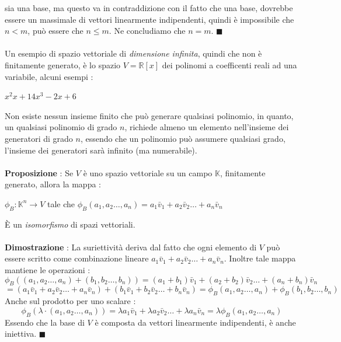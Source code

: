 \documentclass[12pt, letterpaper]{article}
\newcommand{\R}{{\mathbb R}}
\newcommand{\ve}{{\bar v}}
\newcommand{\acc}{\\\hphantom{}\\}
\begin{document}
sia una base, ma questo va in contraddizione con il fatto che una base, dovrebbe essere 
un massimale di vettori linearmente indipendenti, quindi è impossibile che \(n<m\), può essere che 
\(n\le m\). Ne concludiamo che \(n=m\). \(\blacksquare\)\acc 
Un esempio di spazio vettoriale di \textit{dimensione infinita}, quindi che non è 
finitamente generato, è lo spazio \(V=\R[x]\) dei polinomi a coefficenti reali ad una variabile, alcuni esempi : \begin{center}
    \(x^2\)\hphantom{text}\(x+1\)\hphantom{text}\(4x^3-2x+6\)\hphantom{text}
\end{center}
Non esiste nessun insieme finito che può generare qualsiasi polinomio, in quanto, un qualsiasi 
polinomio di grado \(n\), richiede almeno un elemento nell'insieme dei generatori di grado \(n\), 
essendo che un polinomio può assumere qualsiasi grado, l'insieme dei generatori 
sarà infinito (ma numerabile).\acc 
\textbf{Proposizione }: Se \(V\) è uno spazio vettoriale su un campo \(\mathbb{K}\), finitamente 
generato, allora la mappa : \begin{center}
    \(\phi_B : \mathbb{K}^n\rightarrow V\) tale che \(\phi_B(a_1,a_2\dots,a_n)=a_1\ve_1+a_2\ve_2\dots+a_n\ve_n\)
\end{center}
È un  \textit{isomorfismo} di spazi vettoriali.\acc 
\textbf{Dimostrazione }: La suriettività deriva dal fatto che ogni elemento di \(V\) può essere scritto 
come combinazione lineare \(a_1\ve_1+a_2\ve_2\dots+a_n\ve_n\). Inoltre tale mappa mantiene le operazioni : \begin{equation}
    \phi_B((a_1,a_2\dots,a_n)+(b_1,b_2\dots,b_n))=(a_1+b_1)\ve_1+(a_2+b_2)\ve_2\dots+(a_n+b_n)\ve_n
\end{equation}\begin{equation}
    =(a_1\ve_1+a_2\ve_2\dots+a_n\ve_n)+(b_1\ve_1+b_2\ve_2\dots+b_n\ve_n)=\phi_B(a_1,a_2\dots,a_n)+\phi_B(b_1,b_2\dots,b_n)
\end{equation}
Anche sul prodotto per uno scalare : \begin{equation}
    \phi_B(\lambda\cdot(a_1,a_2\dots,a_n))=\lambda a_1\ve_1+\lambda a_2\ve_2\dots+\lambda a_n\ve_n=\lambda\phi_B(a_1,a_2\dots,a_n)
\end{equation}
Essendo che la base di \(V\) è composta da vettori linearmente indipendenti, è anche iniettiva. \(\blacksquare\)
\end{document}

